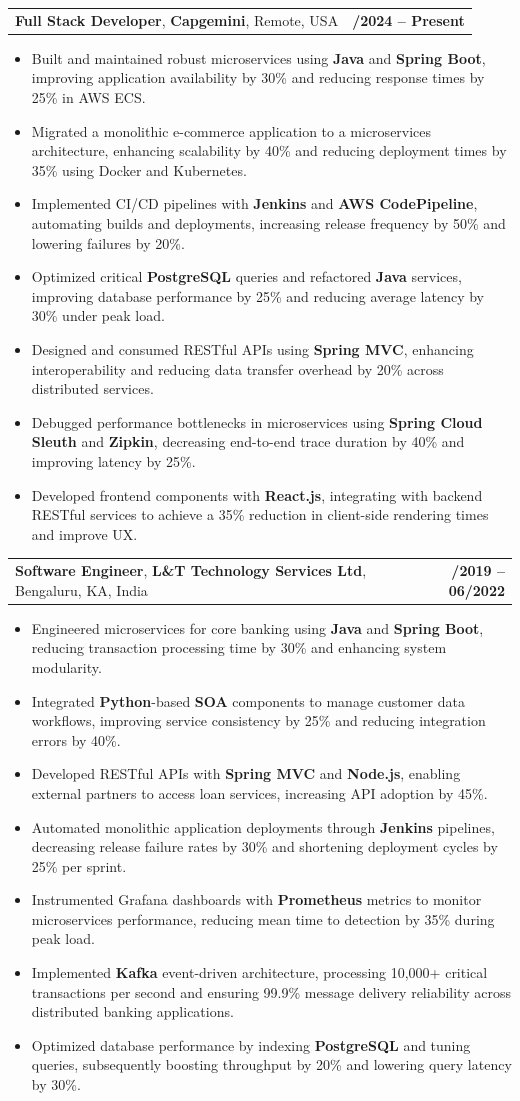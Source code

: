 \documentclass[letterpaper,11pt]{article}
\makeatletter
\newcommand{\resumeItem}[1]{
  \item\footnotesize{
    {#1 \vspace{-2pt}}
  }
}
\newcommand{\resumeSubheading}[4]{
  \vspace{-2pt}\item
    \begin{tabular*}{1.0\textwidth}[t]{l@{\extracolsep{\fill}}r}
      \textbf{\fontsize{10pt}{14pt}\selectfont #3}, \textbf{\fontsize{10pt}{14pt}\selectfont #1}, \fontsize{10pt}{14pt}\selectfont #4 & \textbf{\fontsize{10pt}{14pt}\selectfont #2} \\
    \end{tabular*}\vspace{-7pt}
}
\newcommand{\resumeItemListStart}{\begin{itemize}[leftmargin=*]}
\newcommand{\resumeItemListEnd}{\end{itemize}\vspace{-5pt}}
\makeatother
\begin{document}
    \resumeSubheading
        {Capgemini}{01/2024 -- Present}
        {Full Stack Developer}{Remote, USA}
      \resumeItemListStart
        \resumeItem{Built and maintained robust microservices using \textbf{Java} and \textbf{Spring Boot}, improving application availability by 30\% and reducing response times by 25\% in AWS ECS.}
        \resumeItem{Migrated a monolithic e-commerce application to a microservices architecture, enhancing scalability by 40\% and reducing deployment times by 35\% using Docker and Kubernetes.}
        \resumeItem{Implemented CI/CD pipelines with \textbf{Jenkins} and \textbf{AWS CodePipeline}, automating builds and deployments, increasing release frequency by 50\% and lowering failures by 20\%.}
        \resumeItem{Optimized critical \textbf{PostgreSQL} queries and refactored \textbf{Java} services, improving database performance by 25\% and reducing average latency by 30\% under peak load.}
        \resumeItem{Designed and consumed RESTful APIs using \textbf{Spring MVC}, enhancing interoperability and reducing data transfer overhead by 20\% across distributed services.}
        \resumeItem{Debugged performance bottlenecks in microservices using \textbf{Spring Cloud Sleuth} and \textbf{Zipkin}, decreasing end-to-end trace duration by 40\% and improving latency by 25\%.}
        \resumeItem{Developed frontend components with \textbf{React.js}, integrating with backend RESTful services to achieve a 35\% reduction in client-side rendering times and improve UX.}
      \resumeItemListEnd

    \resumeSubheading
        {L\&T Technology Services Ltd}{08/2019 -- 06/2022}
        {Software Engineer}{Bengaluru, KA, India}
      \resumeItemListStart
        \resumeItem{Engineered microservices for core banking using \textbf{Java} and \textbf{Spring Boot}, reducing transaction processing time by 30\% and enhancing system modularity.}
        \resumeItem{Integrated \textbf{Python}-based \textbf{SOA} components to manage customer data workflows, improving service consistency by 25\% and reducing integration errors by 40\%.}
        \resumeItem{Developed RESTful APIs with \textbf{Spring MVC} and \textbf{Node.js}, enabling external partners to access loan services, increasing API adoption by 45\%.}
        \resumeItem{Automated monolithic application deployments through \textbf{Jenkins} pipelines, decreasing release failure rates by 30\% and shortening deployment cycles by 25\% per sprint.}
        \resumeItem{Instrumented Grafana dashboards with \textbf{Prometheus} metrics to monitor microservices performance, reducing mean time to detection by 35\% during peak load.}
        \resumeItem{Implemented \textbf{Kafka} event-driven architecture, processing 10,000+ critical transactions per second and ensuring 99.9\% message delivery reliability across distributed banking applications.}
        \resumeItem{Optimized database performance by indexing \textbf{PostgreSQL} and tuning queries, subsequently boosting throughput by 20\% and lowering query latency by 30\%.}
      \resumeItemListEnd
\end{document}
